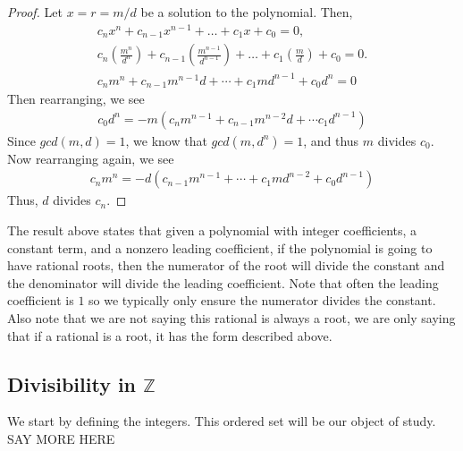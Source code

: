 \documentclass[../main.tex]{subfiles}
\begin{document}
\begin{proof}
Let \( x = r = m/d \) be a solution to the polynomial. Then,
\begin{gather*}
    c_nx^n + c_{n-1}x^{n-1} + \dotsc + c_1x + c_0 = 0, \\
    c_n\left(\frac{m^n}{d^n}\right) + c_{n-1}\left(\frac{m^{n-1}}{d^{n-1}}\right) + \dotsc + c_1\left(\frac{m}{d}\right) + c_0 = 0. \\
    c_n m^n + c_{n-1}m^{n-1}d + \cdots + c_1 m d^{n-1} + c_0 d^n = 0
\end{gather*}
Then rearranging, we see
\begin{gather*}
c_0 d^n = -m \left(c_n m^{n-1} + c_{n-1}m^{n-2} d + \cdots c_1  d^{n-1} \right)
\end{gather*}
Since \( gcd(m,d) = 1\), we know that \( gcd(m,d^n) = 1\), and thus \( m \) divides \( c_ 0\). Now rearranging again, we see
\begin{gather*}
c_n m^n = -d \left(c_{n-1} m^{n-1} + \cdots + c_1 m d^{n-2} + c_0 d^{n-1} \right)
\end{gather*}
Thus, \(d\) divides \(c_n\).
 
\end{proof}









\begin{remark}
    The result above states that given a polynomial with integer coefficients, a constant term, and a nonzero leading coefficient, if the polynomial is going to have rational roots, then the numerator of the root will divide the constant and the denominator will divide the leading coefficient. Note that often the leading coefficient is \(1\) so we typically only ensure the numerator divides the constant. Also note that we are not saying this rational is always a root, we are only saying that if a rational is a root, it has the form described above.
\end{remark}








\subsection{Divisibility in $\mathbb{Z}$}
We start by defining the integers. This ordered set will be our object of study. SAY MORE HERE
\end{document}
